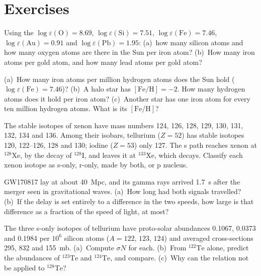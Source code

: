 \section{Exercises}

\begin{exercise}[$\star$]\label{exo:b3:origin-of-elements:1}
Using the  $\log\varepsilon(\mathrm{O}) = 8.69$,
$\log\varepsilon(\mathrm{Si}) = 7.51$, $\log\varepsilon(\mathrm{Fe}) =
7.46$, $\log\varepsilon(\mathrm{Au}) = 0.91$ and
$\log\varepsilon(\mathrm{Pb}) = 1.95$: (a)~how many silicon atoms and
how many oxygen atoms are there in the Sun per iron atom? (b)~How many
iron atoms per gold atom, and how many lead atoms per gold atom?
\end{exercise}

\begin{exercise}[$\star$]\label{exo:b3:origin-of-elements:2}
(a)~How many iron atoms per million hydrogen atoms does the Sun hold
($\log\varepsilon(\mathrm{Fe}) = 7.46$)? (b)~A halo star has
$[\mathrm{Fe/H}] = -2$. How many hydrogen atoms does it hold per iron
atom? (c)~Another star has one iron atom for every ten million hydrogen
atoms. What is its $[\mathrm{Fe/H}]$?
\end{exercise}

\begin{exercise}[$\star$]\label{exo:b3:origin-of-elements:3}
The stable isotopes of xenon have mass numbers 124, 126, 128, 129, 130,
131, 132, 134 and 136. Among their isobars, tellurium ($Z = 52$) has
stable isotopes 120, 122--126, 128 and 130; iodine ($Z = 53$) only 127.
The s path reaches xenon at $^{128}\mathrm{Xe}$, by the decay of
$^{128}\mathrm{I}$, and leaves it at $^{133}\mathrm{Xe}$, which decays.
Classify each xenon isotope as s-only, r-only, made by both, or p
nucleus.
\end{exercise}

\begin{exercise}[$\star$]\label{exo:b3:origin-of-elements:4}
GW170817 lay at about \qty{40}{Mpc}, and its gamma rays arrived
\qty{1.7}{s} after the merger seen in gravitational waves. (a)~How long
had both signals travelled? (b)~If the delay is set entirely to a
difference in the two speeds, how large is that difference as a
fraction of the speed of light, at most?
\end{exercise}

\begin{exercise}[$\star\star$]\label{exo:b3:origin-of-elements:5}
The three s-only isotopes of tellurium have proto-solar abundances
\num{0.1067}, \num{0.0373} and \num{0.1984} per $10^6$ silicon atoms
($A = 122$, $123$, $124$) and averaged cross-sections \num{295},
\num{832} and \qty{155}{mb}. (a)~Compute $\sigma N$ for each. (b)~From
$^{122}\mathrm{Te}$ alone, predict the abundances of $^{123}\mathrm{Te}$
and $^{124}\mathrm{Te}$, and compare. (c)~Why can the relation not be
applied to $^{128}\mathrm{Te}$?
\end{exercise}

